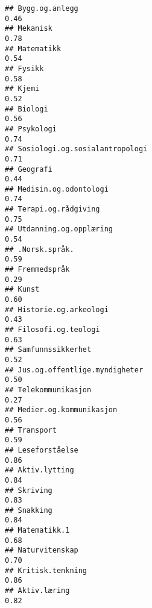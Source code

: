 \documentclass[
]{article}
\begin{document}
\begin{verbatim}
## Bygg.og.anlegg                                                                   0.46
## Mekanisk                                                                         0.78
## Matematikk                                                                       0.54
## Fysikk                                                                           0.58
## Kjemi                                                                            0.52
## Biologi                                                                          0.56
## Psykologi                                                                        0.74
## Sosiologi.og.sosialantropologi                                                   0.71
## Geografi                                                                         0.44
## Medisin.og.odontologi                                                            0.74
## Terapi.og.rådgiving                                                              0.75
## Utdanning.og.opplæring                                                           0.54
## .Norsk.språk.                                                                    0.59
## Fremmedspråk                                                                     0.29
## Kunst                                                                            0.60
## Historie.og.arkeologi                                                            0.43
## Filosofi.og.teologi                                                              0.63
## Samfunnssikkerhet                                                                0.52
## Jus.og.offentlige.myndigheter                                                    0.50
## Telekommunikasjon                                                                0.27
## Medier.og.kommunikasjon                                                          0.56
## Transport                                                                        0.59
## Leseforståelse                                                                   0.86
## Aktiv.lytting                                                                    0.84
## Skriving                                                                         0.83
## Snakking                                                                         0.84
## Matematikk.1                                                                     0.68
## Naturvitenskap                                                                   0.70
## Kritisk.tenkning                                                                 0.86
## Aktiv.læring                                                                     0.82

\end{verbatim}
\end{document}

